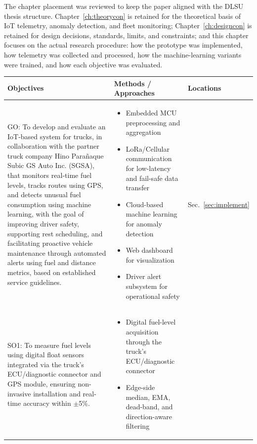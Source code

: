 The chapter placement was reviewed to keep the paper aligned with the DLSU thesis structure. Chapter~\ref{ch:theorycon} is retained for the theoretical basis of IoT telemetry, anomaly detection, and fleet monitoring; Chapter~\ref{ch:designcon} is retained for design decisions, standards, limits, and constraints; and this chapter focuses on the actual research procedure: how the prototype was implemented, how telemetry was collected and processed, how the machine-learning variants were trained, and how each objective was evaluated.
\begin{center}
\scriptsize
\begin{tabularx}{\textwidth}{p{}|X|p{}}
\caption{Summary of methods for reaching the objectives} \label{tab:methods_per_objective} \\
\hline 
\hline 
\textbf{Objectives} & \textbf{Methods / Approaches} & \textbf{Locations} \\ 
\hline 
GO: To develop and evaluate an IoT-based system for trucks, in collaboration with the partner truck company Hino Parañaque Subic GS Auto Inc. (SGSA), that monitors real-time fuel levels, tracks routes using GPS, and detects unusual fuel consumption using machine learning, with the goal of improving driver safety, supporting rest scheduling, and facilitating proactive vehicle maintenance through automated alerts using fuel and distance metrics, based on established service guidelines. &
\begin{itemize}
    \item Embedded MCU preprocessing and aggregation
    \item LoRa/Cellular communication for low-latency and fail-safe data transfer
    \item Cloud-based machine learning for anomaly detection
    \item Web dashboard for visualization
    \item Driver alert subsystem for operational safety
\end{itemize} & Sec.~\ref{sec:implement} \\
\hline 
SO1: To measure fuel levels using digital float sensors integrated via the truck's ECU/diagnostic connector and GPS module, ensuring non-invasive installation and real-time accuracy within $\pm$5\%. &
\begin{itemize}
    \item Digital fuel-level acquisition through the truck's ECU/diagnostic connector
    \item Edge-side median, EMA, dead-band, and direction-aware filtering

\end{itemize}
\end{tabularx}
\end{center}
